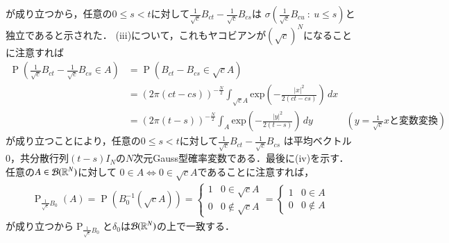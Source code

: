 \begin{prf}
\begin{description}
		が成り立つから，任意の$0 \leq s < t$に対して$\tfrac{1}{\sqrt{c}}B_{ct} - \tfrac{1}{\sqrt{c}}B_{cs}$は
		$\sigma\left(\tfrac{1}{\sqrt{c}}B_{cu}\ :\ u \leq s\right)$と独立であると示された．
		(iii)について，これもヤコビアンが$\left(\sqrt{c}\right)^{N}$になることに注意すれば
		\begin{align}
			\operatorname{P}\left( \tfrac{1}{\sqrt{c}}B_{ct} - \tfrac{1}{\sqrt{c}}B_{cs} \in A \right)
			&= \operatorname{P}\left( B_{ct} - B_{cs} \in \sqrt{c}A \right) \\
			&= (2\pi(ct-cs))^{-\frac{N}{2}} \int_{\sqrt{c}A} \mathrm{exp}\left( -\frac{|x|^2}{2(ct-cs)} \right)\, dx \\
			&= (2\pi(t-s))^{-\frac{N}{2}} \int_{A} \mathrm{exp}\left( -\frac{|y|^2}{2(t-s)} \right)\, dy 
				& \left( y = \tfrac{1}{\sqrt{c}}x\mbox{と変数変換}\right)
		\end{align}
		が成り立つことにより，任意の$0 \leq s < t$に対して$\tfrac{1}{\sqrt{c}}B_{ct} - \tfrac{1}{\sqrt{c}}B_{cs}$
		は平均ベクトル0，共分散行列$(t-s)I_N$の$N$次元Gauss型確率変数である．最後に(iv)を示す．
		任意の$A \in \mathcal{B}(\mathbb{R}^N)$に対して
		$0 \in A \Leftrightarrow 0 \in \sqrt{c}A$であることに注意すれば，
		\begin{align}
			\operatorname{P}_{\tfrac{1}{\sqrt{c}}B_0}(A) 
			= \operatorname{P}\left(B_0^{-1}(\sqrt{c}A)\right)
			= \begin{cases}
				1 & 0 \in \sqrt{c}A \\
				0 & 0 \notin \sqrt{c}A
			\end{cases}
			= \begin{cases}
				1 & 0 \in A \\
				0 & 0 \notin A
			\end{cases}
		\end{align}
		が成り立つから$\operatorname{P}_{\tfrac{1}{\sqrt{c}}B_0}$と$\delta_0$は$\mathcal{B}(\mathbb{R}^N)$の上で一致する．
		

\end{description}
\end{prf}

